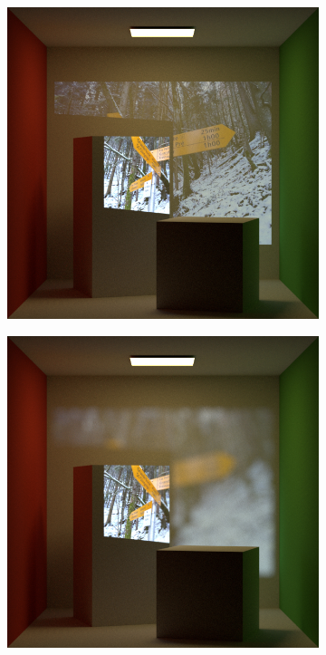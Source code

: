 \begin{figure}[]
\begin{subfigure}[b]{0.32\textwidth}
        \includegraphics[width=\textwidth]{images/03-projector_features-frustum.jpg}
        \caption{}
        \label{fig:methods_projector_features_frustum}
    \end{subfigure}
    \hfill
    \begin{subfigure}[b]{0.32\textwidth}
        \centering
        \includegraphics[width=\textwidth]{images/03-projector_features-thin_lens.jpg}

\end{subfigure}
\end{figure}
